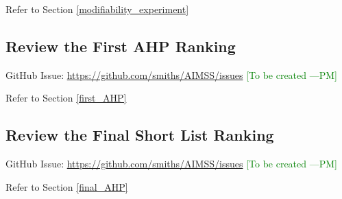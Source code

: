 \documentclass[12pt]{article}
\newcommand{\authornote}[3]{\textcolor{#1}{[#3 ---#2]}}
\newcommand{\authornote}[3]{}
\newcommand{\pmi}[1]{\authornote{green}{PM}{#1}} %
\newcommand{\ad}[1]{\authornote{brown}{AD}{#1}} %
\begin{document}
\noindent Refer to Section \ref{modifiability_experiment}

\subsection{Review the First AHP Ranking}
\label{task_first_ranking}
GitHub Issue:
\href{https://github.com/smiths/AIMSS/issues}{https://github.com/smiths/AIMSS/issues}
\pmi{To be created}

\noindent Refer to Section \ref{first_AHP}

\subsection{Review the Final Short List Ranking}
\label{task_final_ranking}
GitHub Issue:
\href{https://github.com/smiths/AIMSS/issues}{https://github.com/smiths/AIMSS/issues}
\pmi{To be created}

\noindent Refer to Section \ref{final_AHP}

%
%
%
\end{document}
